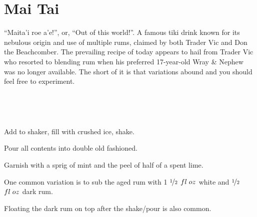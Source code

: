 \section[Mai Tai]{Mai Tai}

\begin{recipestats}[
	servings=1,
	preptime=5 \minute,
	original=\citefield{cocktailSeminars2021}{title} \cite{cocktailSeminars2021},
]
\end{recipestats}


\begin{recipeabstract}
	``Maita'i roe a'e!'', or, ``Out of this world!''.
	A famous tiki drink known for its nebulous origin and use of multiple rums, claimed by both Trader Vic and Don the Beachcomber.
	The prevailing recipe of today appears to hail from Trader Vic who resorted to blending rum when his preferred 17-year-old Wray \& Nephew was no longer available.
	The short of it is that variations abound and you should feel free to experiment.

\end{recipeabstract}


\begin{ingredientcolumns}
	\begin{ingredientblock}
		\\
	\end{ingredientblock}
	\begin{ingredientblock}
		\ingredient[\onehalf][\fluidounce]{cura\c{c}ao}\\
		\ingredient[\onehalf][\fluidounce]{orgeat}
	\end{ingredientblock}
\end{ingredientcolumns}


\begin{preparation}
\item Add to shaker, fill with crushed ice, shake.
\item Pour all contents into double old fashioned.
\item Garnish with a sprig of mint and the peel of half of a spent lime.
\end{preparation}


\begin{variation}
\item One common variation is to sub the aged rum with 1 $\nicefrac{1}{2}$ $fl\;oz$ white and $\nicefrac{1}{2}$ $fl\;oz$ dark rum.
\item Floating the dark rum on top after the shake/pour is also common.
\end{variation}


\recipeend
